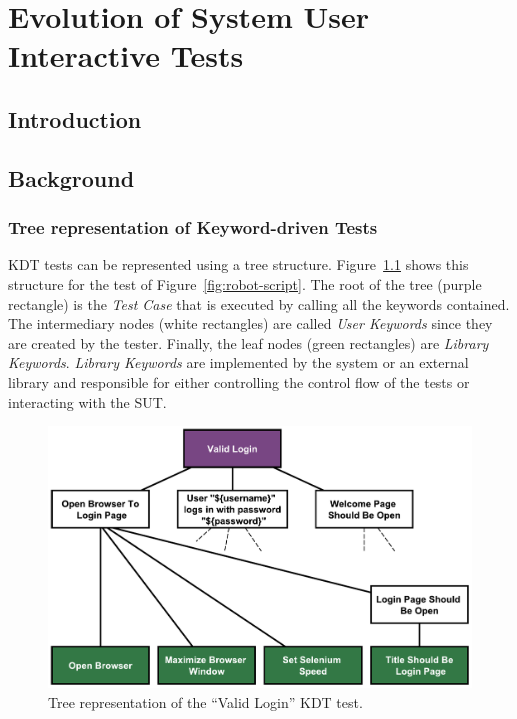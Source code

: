 \chapter{Evolution of System User Interactive Tests}
\label{chap:evolution-system-user-interactive-test}

\section{Introduction}
\label{sec:evolution-introduction}

\section{Background}
\label{sec:evolution-background}

\subsection{Tree representation of Keyword-driven Tests}
\label{sec:tree-representation-KDT}

KDT tests can be represented using a tree structure. Figure~\ref{fig:robotframework_tree} shows this structure for the test of Figure~\ref{fig:robot-script}. The root of the tree (purple rectangle) is the \emph{Test Case} that is executed by calling all the keywords contained. The intermediary nodes (white rectangles) are called \emph{User Keywords} since they are created by the tester. Finally, the leaf nodes (green rectangles) are \emph{Library Keywords}. \emph{Library Keywords} are implemented by the system or an external library and responsible for either controlling the control flow of the tests or interacting with the SUT.

\begin{figure}
\centering
\includegraphics[width=0.7\columnwidth]{figures/evolution/robotframework_tree.pdf}
\caption{Tree representation of the ``Valid Login'' KDT test.}
\label{fig:robotframework_tree}
\end{figure}

